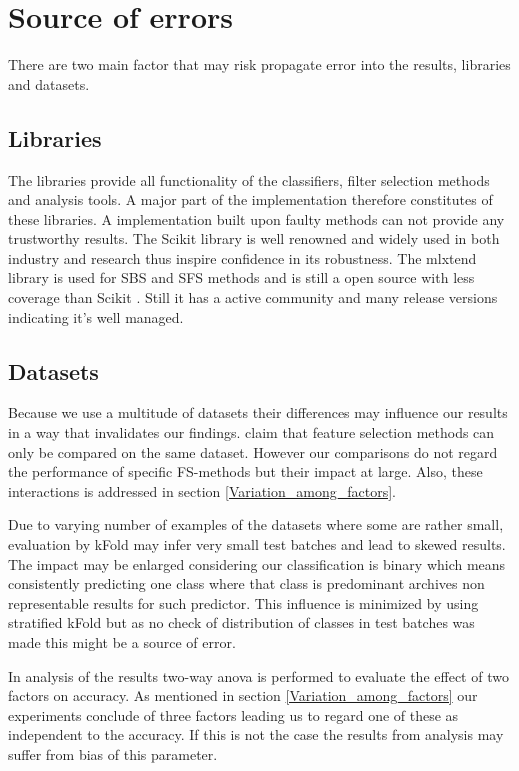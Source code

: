 

\section{Source of errors}
\label{sec:source_of_errors}

There are two main factor that may risk propagate error into the results, libraries and datasets.

\subsection{Libraries}

The libraries provide all functionality of the classifiers, filter selection methods and analysis tools. A major part of the implementation therefore constitutes of these libraries. A implementation built upon faulty methods can not provide any trustworthy results. The Scikit library \parencite{scikit-learn} is well renowned and widely used in both industry and research thus inspire confidence in its robustness. The mlxtend library is used for SBS and SFS methods and is still a open source with less coverage than Scikit \parencite{mlextend}. Still it has a active community and many release versions indicating it's well managed.

\subsection{Datasets}

Because we use a multitude of datasets their differences may influence our results in a way that invalidates our findings. \textcite{c201416} claim that feature selection methods can only be compared on the same dataset. However our comparisons do not regard the performance of specific FS-methods but their impact at large. Also, these interactions is addressed in section \ref{Variation_among_factors}.

Due to varying number of examples of the datasets where some are rather small, evaluation by kFold may infer very small test batches and lead to skewed results. The impact may be enlarged considering our classification is binary which means consistently predicting one class where that class is predominant archives non representable results for such predictor. This influence is minimized by using stratified kFold but as no check of distribution of classes in test batches was made this might be a source of error.

In analysis of the results two-way anova is performed to evaluate the effect of two factors on accuracy. As mentioned in section \ref{Variation_among_factors} our experiments conclude of three factors leading us to regard one of these as independent to the accuracy. If this is not the case the results from analysis may suffer from bias of this parameter.
